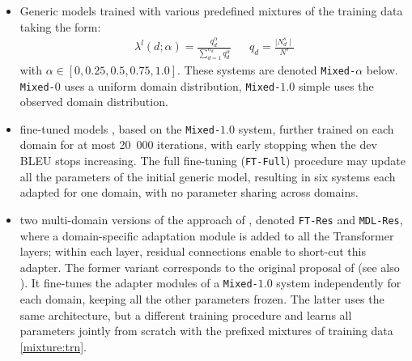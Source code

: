 \documentclass[11pt,a4paper]{article}
\newcommand{\fyTodo}[1]{\Todo[FY:]{\textcolor{orange}{#1}}}
\newcommand{\revision}[1]{\textcolor{red}{#1}}
\newcommand{\system}[1]{\texttt{{#1}}}
\begin{document}
\begin{itemize}
\itemsep0em 
\item Generic models trained with various predefined mixtures of the training data taking the form:
\begin{align} \label{mixture:trn}
\lambda^{l}(d;\alpha) = \frac{q_d^{\alpha}}{\displaystyle{\mathop{\sum}_{d=1}^{n_d}q_d^{\alpha}}} &&
q_d = \frac{\mid N^{s}_d \mid}{\displaystyle{N^{s}}} %
\end{align} 
with $\alpha \in [0,0.25,0.5,0.75,1.0]$. These systems are denoted \system{Mixed-$\alpha$} below. \system{Mixed-$0$} uses a uniform domain distribution, \system{Mixed-$1.0$} simple uses the observed domain distribution.
\item fine-tuned models \cite{Luong15stanford,Freitag16fast}, based on the \system{Mixed-$1.0$} system, further trained on each domain for at most 20~000 iterations, with early stopping when the dev BLEU stops increasing. The full fine-tuning (\system{FT-Full}) procedure may update all the parameters of the initial generic model, resulting in six systems each adapted for one domain, with no parameter sharing across domains.

\item two multi-domain versions of the approach of , denoted \system{FT-Res} and \system{MDL-Res}, where a domain-specific adaptation module is added to all the Transformer layers; within each layer, residual connections enable to short-cut this adapter. The former variant corresponds to the original proposal of \citet{Bapna19simple} (see also \cite{Sharaf20metalearning}). It fine-tunes the adapter modules of a \system{Mixed-$1.0$} system independently for each domain, keeping all the other parameters frozen. The latter uses the same architecture, but a different training procedure and learns all parameters jointly from scratch with the prefixed mixtures of training data \ref{mixture:trn}.\fyTodo{Keep this ?}
\end{itemize}
\end{document}
